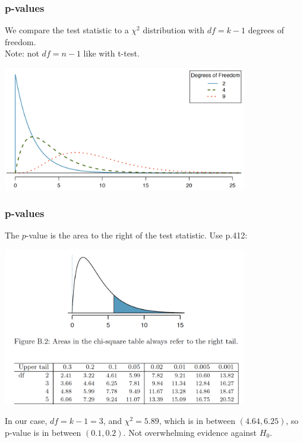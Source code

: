 \documentclass[handout]{beamer}
\newcommand{\blue}[1]{\textcolor{blue2}{#1}}
\begin{document}
\begin{frame}[fragile]
\frametitle{p-values}
We compare the test statistic to a $\chi^2$ distribution with $df=k-1$ degrees of freedom.\\  Note: not $df=n-1$ like with t-test.  

\vspace{0.25cm}

\begin{center}
\includegraphics[width=0.8\textwidth]{figure/chi.png}
\end{center}

\end{frame}


\begin{frame}[fragile]
\frametitle{p-values}
The $p$-value is the \blue{area to the right} of the test statistic.  Use p.412:
\begin{center}
\includegraphics[width=0.8\textwidth]{figure/table.png}
\end{center}
%
%
\pause In our case, $df=k-1=3$, and $\chi^2=5.89$, which is in between $(4.64, 6.25)$, so p-value is in between $(0.1, 0.2)$.  Not overwhelming evidence against $H_0$.

\end{frame}
\end{document}

